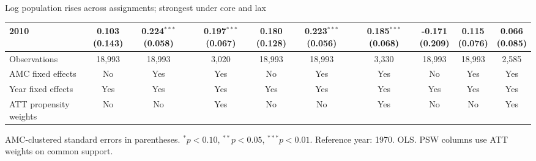 \documentclass[aspectratio=169]{beamer}
\begin{document}
\begin{frame}{Log population rises across assignments; strongest under core and lax}
{\begin{tabular}{@{}l*{9}{c}@{}}
2010 & \shortstack{0.103\\(0.143)} & \shortstack{0.224$^{***}$\\(0.058)} & \shortstack{0.197$^{***}$\\(0.067)} & \shortstack{0.180\\(0.128)} & \shortstack{0.223$^{***}$\\(0.056)} & \shortstack{0.185$^{***}$\\(0.068)} & \shortstack{-0.171\\(0.209)} & \shortstack{0.115\\(0.076)} & \shortstack{0.066\\(0.085)} \\
\midrule
Observations & 18,993 & 18,993 & 3,020 & 18,993 & 18,993 & 3,330 & 18,993 & 18,993 & 2,585 \\
AMC fixed effects & No & Yes & Yes & No & Yes & Yes & No & Yes & Yes \\
Year fixed effects & Yes & Yes & Yes & Yes & Yes & Yes & Yes & Yes & Yes \\
ATT propensity weights & No & No & Yes & No & No & Yes & No & No & Yes \\
\bottomrule
\end{tabular}%
}
\vspace{0.1em}
{\tiny\color{ZMidGray} AMC-clustered standard errors in parentheses. $^{*}p<0.10$, $^{**}p<0.05$, $^{***}p<0.01$. Reference year: 1970. OLS. PSW columns use ATT weights on common support.}
\end{frame}
\end{document}

